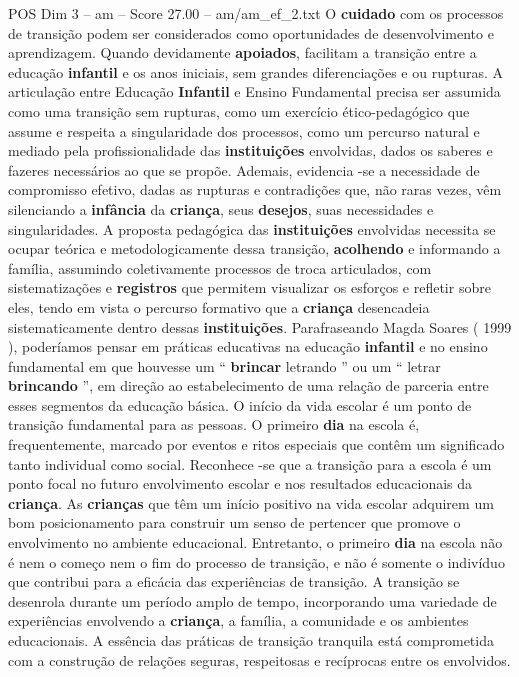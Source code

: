 \begin{textsample}{POS Dim 3 – am – Score 27.00 – am/am\_ef\_2.txt}
O \textbf{cuidado} com os processos de transição podem ser considerados como oportunidades de desenvolvimento e aprendizagem.
Quando devidamente \textbf{apoiados}, facilitam a transição entre a educação \textbf{infantil} e os anos iniciais, sem grandes diferenciações e ou rupturas.
A articulação entre Educação \textbf{Infantil} e Ensino Fundamental precisa ser assumida como uma transição sem rupturas, como um exercício ético-pedagógico que assume e respeita a singularidade dos processos, como um percurso natural e mediado pela profissionalidade das \textbf{instituições} envolvidas, dados os saberes e fazeres necessários ao que se propõe.
Ademais, evidencia -se a necessidade de compromisso efetivo, dadas as rupturas e contradições que, não raras vezes, vêm silenciando a \textbf{infância} da \textbf{criança}, seus \textbf{desejos}, suas necessidades e singularidades.
A proposta pedagógica das \textbf{instituições} envolvidas necessita se ocupar teórica e metodologicamente dessa transição, \textbf{acolhendo} e informando a família, assumindo coletivamente processos de troca articulados, com sistematizações e \textbf{registros} que permitem visualizar os esforços e refletir sobre eles, tendo em vista o percurso formativo que a \textbf{criança} desencadeia sistematicamente dentro dessas \textbf{instituições}.
Parafraseando Magda Soares ( 1999 ), poderíamos pensar em práticas educativas na educação \textbf{infantil} e no ensino fundamental em que houvesse um “ \textbf{brincar} letrando ” ou um “ letrar \textbf{brincando} ”, em direção ao estabelecimento de uma relação de parceria entre esses segmentos da educação básica.
O início da vida escolar é um ponto de transição fundamental para as pessoas.
O primeiro \textbf{dia} na escola é, frequentemente, marcado por eventos e ritos especiais que contêm um significado tanto individual como social.
Reconhece -se que a transição para a escola é um ponto focal no futuro envolvimento escolar e nos resultados educacionais da \textbf{criança}.
As \textbf{crianças} que têm um início positivo na vida escolar adquirem um bom posicionamento para construir um senso de pertencer que promove o envolvimento no ambiente educacional.
Entretanto, o primeiro \textbf{dia} na escola não é nem o começo nem o fim do processo de transição, e não é somente o indivíduo que contribui para a eficácia das experiências de transição.
A transição se desenrola durante um período amplo de tempo, incorporando uma variedade de experiências envolvendo a \textbf{criança}, a família, a comunidade e os ambientes educacionais.
A essência das práticas de transição tranquila está comprometida com a construção de relações seguras, respeitosas e recíprocas entre os envolvidos.

\end{textsample}
